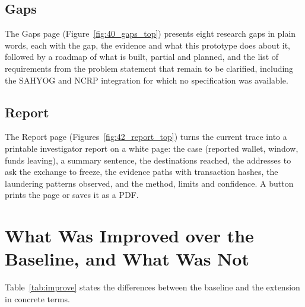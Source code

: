
\subsection{Gaps}
The Gaps page (Figure~\ref{fig:40_gaps_top}) presents eight research gaps in plain words, each with the gap, the evidence and what this prototype does about it, followed by a roadmap of what is built, partial and planned, and the list of requirements from the problem statement that remain to be clarified, including the SAHYOG and NCRP integration for which no specification was available.


\subsection{Report}
The Report page (Figures~\ref{fig:42_report_top}) turns the current trace into a printable investigator report on a white page: the case (reported wallet, window, funds leaving), a summary sentence, the destinations reached, the addresses to ask the exchange to freeze, the evidence paths with transaction hashes, the laundering patterns observed, and the method, limits and confidence. A button prints the page or saves it as a PDF.


\section{What Was Improved over the Baseline, and What Was Not}
\label{sec:improvements}
Table~\ref{tab:improve} states the differences between the baseline and the extension in concrete terms.

